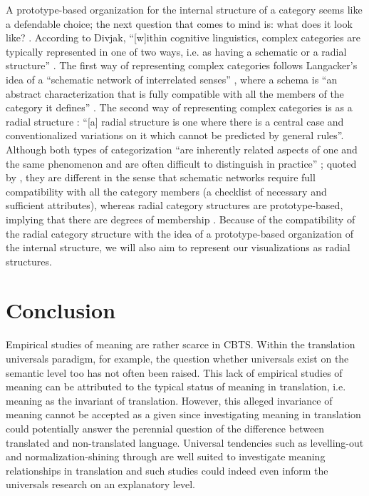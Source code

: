 A prototype-based organization for the internal structure of a category seems like a defendable choice; the next question that comes to mind is: what does it look like? \citep[149]{divjak_structuring_2010}. According to Divjak, “[w]ithin cognitive linguistics, complex categories are typically represented in one of two ways, i.e. as having a schematic or a radial structure” \citep[149]{divjak_structuring_2010}. The first way of representing complex categories follows Langacker’s idea of a “schematic network of interrelated senses” \citep[369,371]{langacker_foundations_1987}, where a schema is “an abstract characterization that is fully compatible with all the members of the category it defines” \citep[149]{divjak_structuring_2010}. The second way of representing complex categories is as a radial structure \citep[84]{lakoff_women_1987}: “[a] radial structure is one where there is a central case and conventionalized variations on it which cannot be predicted by general rules”. Although both types of categorization “are inherently related aspects of one and the same phenomenon and are often difficult to distinguish in practice” \citep[371 ff.]{langacker_foundations_1987}; quoted by \citep[149]{divjak_structuring_2010}, they are different in the sense that schematic networks require full compatibility with all the category members (a checklist of necessary and sufficient attributes), whereas radial category structures are prototype-based, implying that there are degrees of membership \citep[150]{divjak_structuring_2010}. Because of the compatibility of the radial category structure with the idea of a prototype-based organization of the internal structure, we will also aim to represent our visualizations as radial structures.

\section{Conclusion}
\label{sec:2.5}  
Empirical studies of meaning are rather scarce in CBTS. Within the translation universals paradigm, for example, the question whether universals exist on the semantic level too has not often been raised. This lack of empirical studies of meaning can be attributed to the typical status of meaning in translation, i.e. meaning as the invariant of translation. However, this alleged invariance of meaning cannot be accepted as a given since investigating meaning in translation could potentially answer the perennial question of the difference between translated and non-translated language. Universal tendencies such as levelling-out and normalization-shining through are well suited to investigate meaning relationships in translation and such studies could indeed even inform the universals research on an explanatory level.

